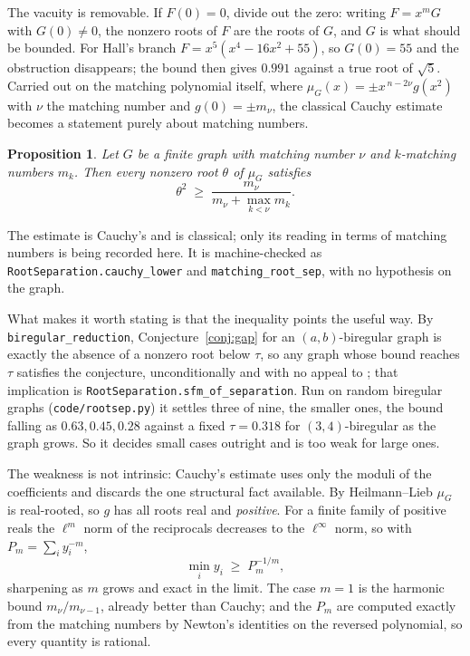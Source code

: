\documentclass[11pt]{article}
\newtheorem{proposition}[theorem]{Proposition}
\theoremstyle{remark}
\begin{document}
The vacuity is removable. If $F(0)=0$, divide out the zero: writing $F=x^mG$ with $G(0)\neq0$,
the nonzero roots of $F$ are the roots of $G$, and $G$ is what should be bounded. For Hall's
branch $F=x^5(x^4-16x^2+55)$, so $G(0)=55$ and the obstruction disappears; the bound then
gives $0.991$ against a true root of $\sqrt5$. Carried out on the matching polynomial itself,
where $\mu_G(x)=\pm x^{\,n-2\nu}g(x^2)$ with $\nu$ the matching number and $g(0)=\pm m_\nu$,
the classical Cauchy estimate becomes a statement purely about matching numbers.

\begin{proposition}\label{prop:rootsep}
Let $G$ be a finite graph with matching number $\nu$ and $k$-matching numbers $m_k$. Then
every nonzero root $\theta$ of $\mu_G$ satisfies
\[
   \theta^2\;\ge\;\frac{m_\nu}{m_\nu+\max_{k<\nu}m_k}.
\]
\end{proposition}

The estimate is Cauchy's and is classical; only its reading in terms of matching numbers is
being recorded here. It is machine-checked as \texttt{RootSeparation.cauchy\_lower} and
\texttt{matching\_root\_sep}, with no hypothesis on the graph.

What makes it worth stating is that the inequality points the useful way. By
\texttt{biregular\_reduction}, Conjecture~\ref{conj:gap} for an $(a,b)$-biregular graph is
exactly the absence of a nonzero root below $\tau$, so any graph whose bound reaches $\tau$
satisfies the conjecture, unconditionally and with no appeal to \cite{AFH}; that implication
is \texttt{RootSeparation.sfm\_of\_separation}. Run on random biregular graphs
(\texttt{code/rootsep.py}) it settles three of nine, the smaller ones, the bound falling as
$0.63,0.45,0.28$ against a fixed $\tau=0.318$ for $(3,4)$-biregular as the graph grows. So it
decides small cases outright and is too weak for large ones.

The weakness is not intrinsic: Cauchy's estimate uses only the moduli of the coefficients and
discards the one structural fact available. By Heilmann--Lieb $\mu_G$ is real-rooted, so $g$
has all roots real and \emph{positive}. For a finite family of positive reals the $\ell^m$
norm of the reciprocals decreases to the $\ell^\infty$ norm, so with
$P_m=\sum_i y_i^{-m}$,
\[
   \min_i y_i\;\ge\;P_m^{-1/m},
\]
sharpening as $m$ grows and exact in the limit. The case $m=1$ is the harmonic bound
$m_\nu/m_{\nu-1}$, already better than Cauchy; and the $P_m$ are computed exactly from the
matching numbers by Newton's identities on the reversed polynomial, so every quantity is
rational.
\end{document}

